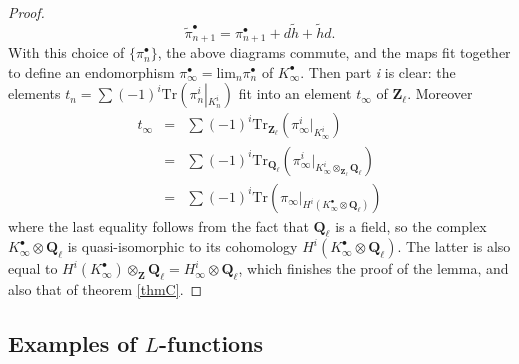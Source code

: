 \begin{proof}
$$
\tilde\pi_{n+1}^\bullet = \pi_{n+1}^\bullet +  d\tilde h+\tilde hd.
$$
With this choice of $\{\pi_n^\bullet\}$, the above diagrams commute, and the maps fit together to define an endomorphism $\pi_\infty^\bullet = \text{lim}_n\pi_n^\bullet$ of $K_\infty^\bullet$. Then part {\it i} is clear: the elements $t_n = \sum(-1)^i \text{Tr}\left(\pi_n^i\left|_{K_n^i}\right.\right)$ fit into an element $t_\infty$ of $\mathbf{Z}_\ell$. Moreover
\begin{eqnarray*}
t_\infty & = & \sum(-1)^i \text{Tr}_{\mathbf{Z}_\ell}\left(\pi_\infty^i\big|_{K_\infty^i}\right) \\
& = & \sum(-1)^i \text{Tr}_{\mathbf{Q}_\ell}\left(\pi_\infty^i\big|_{K_\infty^i\otimes_{\mathbf{Z}_\ell}\mathbf{Q}_\ell}\right)\\
& = &\sum(-1)^i\text{Tr}\left(\pi_\infty\big|_{H^i(K_\infty^\bullet\otimes\mathbf{Q}_\ell)}\right)
\end{eqnarray*}
where the last equality follows from the fact that $\mathbf{Q}_\ell$ is a field, so the complex $K_\infty^\bullet\otimes\mathbf{Q}_\ell$ is quasi-isomorphic to its cohomology $H^i(K_\infty^\bullet\otimes\mathbf{Q}_\ell)$. The latter is also equal to $H^i(K_\infty^\bullet)\otimes_{\mathbf{Z}}\mathbf{Q}_\ell = H_\infty^i\otimes \mathbf{Q}_\ell$, which finishes the proof of the lemma, and also that of theorem \ref{thmC}.
\end{proof}



\subsection{Examples of $L$-functions} 

